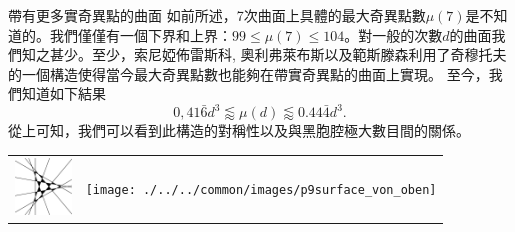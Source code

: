 \begin{surferPage}[216奇異點]{帶有更多實奇異點的曲面}
如前所述，7次曲面上具體的最大奇異點數$\mu(7)$是不知道的。我們僅僅有一個下界和上界：$99\le \mu(7) \le 104$。對一般的次數$d$的曲面我們知之甚少。至少，索尼婭佈雷斯科, 奧利弗萊布斯以及範斯滕森利用了奇穆托夫的一個構造使得當今最大奇異點數也能夠在帶實奇異點的曲面上實現。
至今，我們知道如下結果\[0,41\bar{6}d^3 \lessapprox \mu(d) \lessapprox 0.44\bar{4} d^3.\]
從上可知，我們可以看到此構造的對稱性以及與黑胞腔極大數目間的關係。
 \begin{center}
      \begin{tabular}{c@{\qquad}c}
        \includegraphics[height=1.5cm]{./../../common/images/vielesing.pdf}
        &
        \texttt{[image: ./../../common/images/p9surface\_von\_oben]}
      \end{tabular}
    \end{center}
\end{surferPage}
